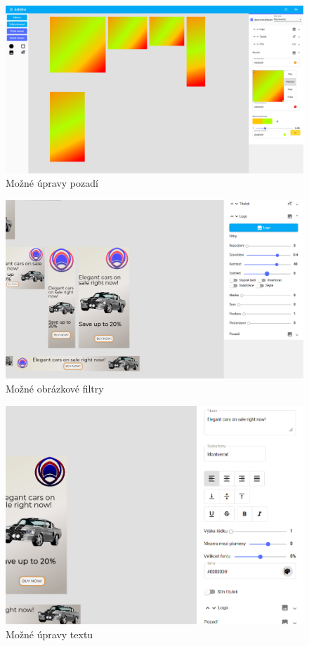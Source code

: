 \documentclass[czech,bachelor]{diploma}
\begin{document}
\begin{figure}[h]
    \includegraphics[width=1.0\textwidth]{Figures/editor/upravy-pozadi.png}
    \caption{Možné úpravy pozadí}
    \label{fig:editor:backgrounds}
\end{figure}

\begin{figure}[h]
    \includegraphics[width=1.0\textwidth]{Figures/editor/obrazkove-filtry.png}
    \caption{Možné obrázkové filtry}
    \label{fig:editor:filters}
\end{figure}


\begin{figure}[h]
    \includegraphics[width=1.0\textwidth]{Figures/editor/uprava-textu.png}
    \caption{Možné úpravy textu}
    \label{fig:editor:text-edit}
\end{figure}
\end{document}
